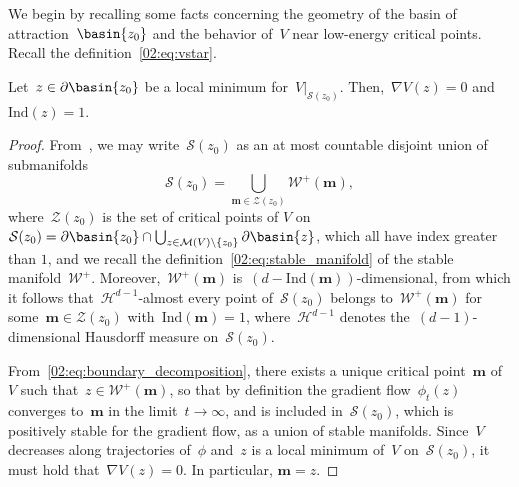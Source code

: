             We begin by recalling some facts concerning the geometry of the basin of attraction~$\basin{z_0}$ and the behavior of~$V$ near low-energy critical points.
            Recall the definition~\eqref{02:eq:vstar}.
            \begin{lemma}
                \label{02:lemma:local_minimum}
                Let~$z\in \partial \basin{z_0}$ be a local minimum for~$V|_{\mathcal S(z_0)}$. Then,~$\nabla V(z) = 0$ and~$\mathrm{Ind}(z)=1$.
            \end{lemma}
            \begin{proof}
                From~\cite[Theorem B.13]{MS14}, we may write~$\mathcal S(z_0)$ as an at most countable disjoint union of submanifolds
                \begin{equation}
                \label{02:eq:boundary_decomposition}
                \mathcal S({z_0}) = \bigcup_{\mathbf{m}\in\mathcal Z(z_0)} \mathcal W^+(\mathbf m),
                \end{equation}
                where~$\mathcal Z(z_0)$ is the set of critical points of $V$ on~$\mathcal S(z_0)=\partial\basin{z_0} \cap \bigcup_{z\in \mathcal M(V)\setminus \{z_0\}}\partial\basin{z}$, which all have index greater than $1$, and we recall the definition~\eqref{02:eq:stable_manifold} of the stable manifold~$\mathcal W^+$.
                Moreover,~$\mathcal W^+(\mathbf m)$ is~$(d-\mathrm{Ind}(\mathbf m))$-dimensional, from which it follows that~$\mathcal H^{d-1}$-almost every point of~$\mathcal S({z_0})$ belongs to~$\mathcal W^+(\mathbf m)$ for some~$\mathbf m\in\mathcal Z(z_0)$ with~$\mathrm{Ind}(\mathbf m)=1$, where~$\mathcal H^{d-1}$ denotes the~$(d-1)$-dimensional Hausdorff measure on~$\mathcal S({z_0})$.

                From~\eqref{02:eq:boundary_decomposition}, there exists a unique critical point~$\mathbf m$ of $V$ such that~$z\in\mathcal W^+(\mathbf m)$, so that by definition the gradient flow~$\phi_t(z)$ converges to~$\mathbf m$ in the limit~$t\to\infty$, and is included in~$\mathcal S({z_0})$, which is positively stable for the gradient flow, as a union of stable manifolds. Since~$V$ decreases along trajectories of~$\phi$ and~$z$ is a local minimum of~$V$ on~$\mathcal S(z_0)$, it must hold that~$\nabla V(z)=0$. In particular, $\mathbf m=z$.


\end{proof}
